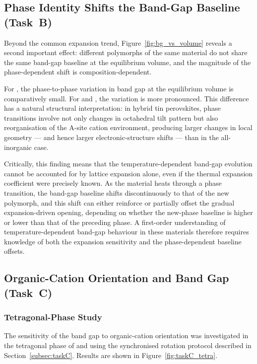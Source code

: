 \subsection{Phase Identity Shifts the Band-Gap Baseline (Task~B)}
\label{subsec:results_taskB_phase}

Beyond the common expansion trend, Figure~\ref{fig:bg_vs_volume}
reveals a second important effect: different polymorphs of the same
material do not share the same band-gap baseline at the equilibrium
volume, and the magnitude of the phase-dependent shift is
composition-dependent.

For \CsSnI{}, the phase-to-phase variation in band gap at the
equilibrium volume is comparatively small.
For \FASnI{} and \MASnI{}, the variation is more pronounced.
This difference has a natural structural interpretation: in hybrid
tin perovskites, phase transitions involve not only changes in
octahedral tilt pattern but also reorganisation of the A-site
cation environment, producing larger changes in local 
geometry --- and hence larger electronic-structure shifts --- than
in the all-inorganic case.

Critically, this finding means that the temperature-dependent
band-gap evolution cannot be accounted for by lattice expansion
alone, even if the thermal expansion coefficient were precisely
known.
As the material heats through a phase transition, the band-gap
baseline shifts discontinuously to that of the new polymorph, and
this shift can either reinforce or partially offset the gradual
expansion-driven opening, depending on whether the new-phase
baseline is higher or lower than that of the preceding phase.
A first-order understanding of temperature-dependent band-gap
behaviour in these materials therefore requires knowledge of both
the expansion sensitivity and the phase-dependent baseline offsets.

\subsection{Organic-Cation Orientation and Band Gap (Task~C)}
\label{subsec:results_taskC}

\subsubsection{Tetragonal-Phase Study}

The sensitivity of the band gap to organic-cation orientation was
investigated in the tetragonal phase of \FASnI{} and \MASnI{}
using the synchronised rotation protocol described in
Section~\ref{subsec:taskC}.
Results are shown in Figure~\ref{fig:taskC_tetra}.

